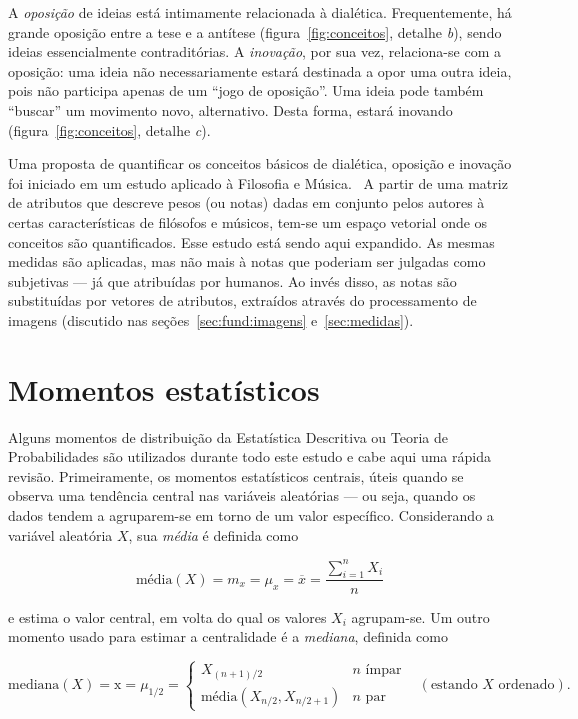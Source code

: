 A \textit{oposição} de ideias está intimamente relacionada à
dialética. Frequentemente, há grande oposição entre a tese e a
antítese (figura~\ref{fig:conceitos}, detalhe \textit{b}), sendo
ideias essencialmente contraditórias. A \textit{inovação}, por sua
vez, relaciona-se com a oposição: uma ideia não necessariamente estará
destinada a opor uma outra ideia, pois não participa apenas de um
``jogo de oposição''. Uma ideia pode também ``buscar'' um movimento
novo, alternativo. Desta forma, estará inovando
(figura~\ref{fig:conceitos}, detalhe \textit{c}).

Uma proposta de quantificar os conceitos básicos de dialética,
oposição e inovação foi iniciado em um estudo aplicado à Filosofia e
Música.~\cite{vieira} A partir de uma matriz de atributos que descreve
pesos (ou notas) dadas em conjunto pelos autores à certas
características de filósofos e músicos, tem-se um espaço vetorial onde
os conceitos são quantificados. Esse estudo está sendo aqui expandido.
As mesmas medidas são aplicadas, mas não mais à notas que poderiam ser
julgadas como subjetivas --- já que atribuídas por humanos. Ao invés
disso, as notas são substituídas por vetores de atributos, extraídos
através do processamento de imagens (discutido nas
seções~\ref{sec:fund:imagens} e~\ref{sec:medidas}).

\section{Momentos estatísticos}
\label{sec:momentos}

Alguns momentos de distribuição da Estatística Descritiva ou Teoria de
Probabilidades são utilizados durante todo este estudo e cabe aqui uma
rápida revisão. Primeiramente, os momentos estatísticos centrais,
úteis quando se observa uma tendência central nas variáveis aleatórias
--- ou seja, quando os dados tendem a agruparem-se em torno de um
valor específico. Considerando a variável aleatória $X$,
sua \textit{média} é definida como~\cite{recipes}

\begin{equation}
\text{média}(X) = m_x=\mu_x=\overline{x}=\frac{\sum_{i=1}^{n}X_i}{n}
\end{equation}

\noindent e estima o valor central, em volta do qual os valores $X_i$ agrupam-se. Um outro momento usado para estimar a centralidade é a \textit{mediana}, definida como

\begin{equation}
\text{mediana}(X) = \text{\~{x}} =\mu_{1/2}= \begin{cases}
                               X_{(n+1)/2} & n \,\, \text{ímpar} \\
                               \text{média}(X_{n/2}, X_{n/2+1}) & n \,\, \text{par}
                               \end{cases} \,\,\,\,\, (\text{estando $X$ ordenado}).
\end{equation}

